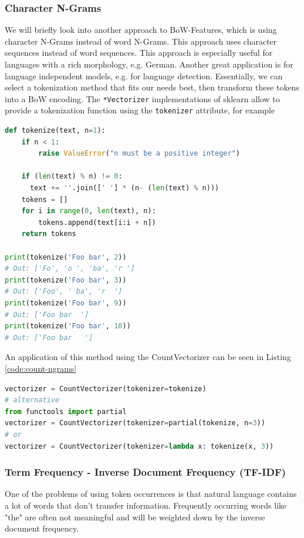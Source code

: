 \subsubsection{Character N-Grams}
We will briefly look into another approach to BoW-Features, which is using character N-Grams instead of word N-Grams.
This approach uses character sequences instead of word sequences. This approach is especially useful for languages with a rich morphology, e.g. German.
Another great application is for language independent models, e.g. for language detection.
Essentially, we can select a tokenization method that fits our needs best, then transform these tokens into a BoW encoding.
The \lstinline{*Vectorizer} implementations of sklearn allow to provide a tokenization function using the \lstinline{tokenizer} attribute, for example
\begin{lstlisting}[language=Python, label={code:character-n-grams}]
def tokenize(text, n=1):
    if n < 1:
        raise ValueError("n must be a positive integer")
    
    if (len(text) % n) != 0:
      text += ''.join([' '] * (n- (len(text) % n)))
    tokens = []
    for i in range(0, len(text), n):
        tokens.append(text[i:i + n])
    return tokens

print(tokenize('Foo bar', 2))
# Out: ['Fo', 'o ', 'ba', 'r ']
print(tokenize('Foo bar', 3))
# Out: ['Foo', ' ba', 'r  ']
print(tokenize('Foo bar', 9))
# Out: ['Foo bar  ']
print(tokenize('Foo bar', 10))
# Out: ['Foo bar   ']
\end{lstlisting}
An application of this method using the CountVectorizer can be seen in Listing \ref{code:count-ngrams}
\begin{lstlisting}[language=Python, label={code:count-ngrams}]
vectorizer = CountVectorizer(tokenizer=tokenize)
# alternative
from functools import partial
vectorizer = CountVectorizer(tokenizer=partial(tokenize, n=3))
# or
vectorizer = CountVectorizer(tokenizer=lambda x: tokenize(x, 3))
\end{lstlisting}
\subsubsection{Term Frequency - Inverse Document Frequency (TF-IDF)}
One of the problems of using token occurrences is that natural language contains a lot of words that don't transfer information.
Frequently occurring words like "the" are often not meaningful and will be weighted down by the inverse document frequency.



